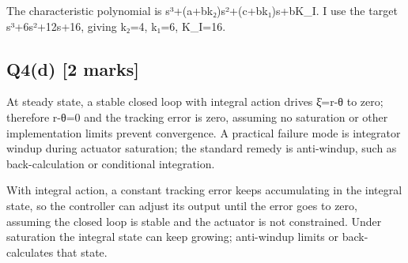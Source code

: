 \documentclass[11pt,a4paper]{article}
\begin{document}
The characteristic polynomial is s³+(a+bk₂)s²+(c+bk₁)s+bK\_I.
I use the target s³+6s²+12s+16, giving k₂=4, k₁=6, K\_I=16.

\subsection*{Q4(d) \hfill [2 marks]}

At steady state, a stable closed loop with integral action drives ξ̇=r-θ to zero; therefore r-θ=0 and the tracking error is zero, assuming no saturation or other implementation limits prevent convergence.
A practical failure mode is integrator windup during actuator saturation; the standard remedy is anti-windup, such as back-calculation or conditional integration.\par\smallskip With integral action, a constant tracking error keeps accumulating in the integral state, so the controller can adjust its output until the error goes to zero, assuming the closed loop is stable and the actuator is not constrained. Under saturation the integral state can keep growing; anti-windup limits or back-calculates that state.
\end{document}
